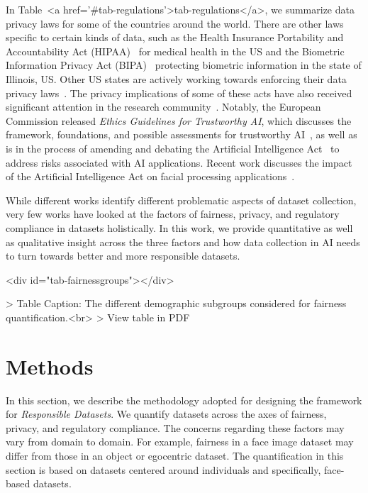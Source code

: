 \documentclass[journal]{IEEEtran}
\begin{document}
In Table~<a href='#tab-regulations'>tab-regulations</a>, we summarize data privacy laws for some of the countries around the world. There are other laws specific to certain kinds of data, such as the Health Insurance Portability and Accountability Act (HIPAA)~\cite{act1996health} for medical health in the US and the Biometric Information Privacy Act (BIPA)~\cite{bipa} protecting biometric information in the state of Illinois, US. Other US states are actively working towards enforcing their data privacy laws~\cite{newUSlaws}. The privacy implications of some of these acts have also received significant attention in the research community~\cite{nosowsky2006health}. Notably, the European Commission released \textit{Ethics Guidelines for Trustworthy AI}, which discusses the framework, foundations, and possible assessments for trustworthy AI~\cite{ethicsai}, as well as is in the process of amending and debating the Artificial Intelligence Act~\cite{euaiact} to address risks associated with AI applications. Recent work discusses the impact of the Artificial Intelligence Act on facial processing applications~\cite{hupont2022landscape}.

While different works identify different problematic aspects of dataset collection, very few works have looked at the factors of fairness, privacy, and regulatory compliance in datasets holistically. In this work, we provide quantitative as well as qualitative insight across the three factors and how data collection in AI needs to turn towards better and more responsible datasets.

\begin{table}<div id="tab-fairnessgroups"></div>

> Table Caption: The different demographic subgroups considered for fairness quantification.<br>
> View table in PDF
\end{table}


\section{Methods}
In this section, we describe the methodology adopted for designing the framework for \textit{Responsible Datasets}. We quantify datasets across the axes of fairness, privacy, and regulatory compliance. The concerns regarding these factors may vary from domain to domain. For example, fairness in a face image dataset may differ from those in an object or egocentric dataset. The quantification in this section is based on datasets centered around individuals and specifically, face-based datasets.
\end{document}
